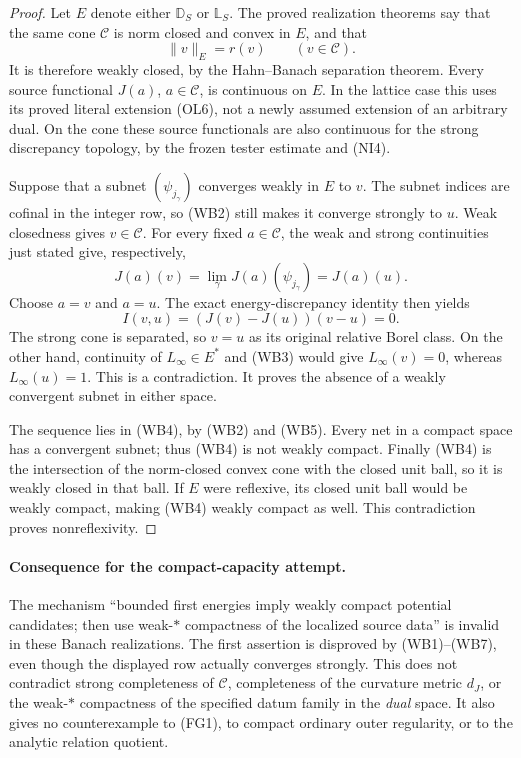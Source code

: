 \documentclass[11pt,a4paper]{article}
\numberwithin{equation}{section}
\theoremstyle{definition}
\theoremstyle{remark}
\begin{document}
\begin{proof}
Let $E$ denote either $\mathbb D_S$ or $\mathbb L_S$.
The proved realization theorems say that the same cone
$\mathscr C$ is norm closed and convex in $E$, and that
\[
                         \|v\|_E=r(v)\qquad(v\in\mathscr C).
 \tag{WB5}
\]
It is therefore weakly closed, by the Hahn--Banach
separation theorem. Every source functional $J(a)$,
$a\in\mathscr C$, is continuous on $E$. In the lattice
case this uses its proved literal extension (OL6),
not a newly assumed extension of an arbitrary dual.
On the cone these source functionals are also continuous
for the strong discrepancy topology, by the frozen
tester estimate and (NI4).

Suppose that a subnet $(\psi_{j_\gamma})$ converges
weakly in $E$ to $v$. The subnet indices are cofinal
in the integer row, so (WB2) still makes it converge
strongly to $u$. Weak closedness gives $v\in\mathscr C$.
For every fixed $a\in\mathscr C$, the weak and strong
continuities just stated give, respectively,
\[
      J(a)(v)=\lim_\gamma J(a)(\psi_{j_\gamma})=J(a)(u).
 \tag{WB6}
\]
Choose $a=v$ and $a=u$. The exact energy-discrepancy
identity then yields
\[
              I(v,u)=(J(v)-J(u))(v-u)=0.
 \tag{WB7}
\]
The strong cone is separated, so $v=u$ as its original
relative Borel class. On the other hand, continuity of
$L_\infty\in E^*$ and (WB3) would give
$L_\infty(v)=0$, whereas $L_\infty(u)=1$. This is a
contradiction. It proves the absence of a weakly
convergent subnet in either space.

The sequence lies in (WB4), by (WB2) and (WB5).
Every net in a compact space has a convergent subnet;
thus (WB4) is not weakly compact. Finally (WB4) is
the intersection of the norm-closed convex cone with
the closed unit ball, so it is weakly closed in that
ball. If $E$ were reflexive, its closed unit ball
would be weakly compact, making (WB4) weakly compact
as well. This contradiction proves nonreflexivity.
\end{proof}

\paragraph{Consequence for the compact-capacity attempt.}
The mechanism ``bounded first energies imply weakly compact
potential candidates; then use weak-$*$ compactness of the
localized source data'' is invalid in these Banach realizations.
The first assertion is disproved by (WB1)--(WB7), even though
the displayed row actually converges strongly. This does not
contradict strong completeness of $\mathscr C$, completeness
of the curvature metric $d_J$, or the weak-$*$ compactness
of the specified datum family in the \emph{dual} space.
It also gives no counterexample to (FG1), to compact ordinary
outer regularity, or to the analytic relation quotient.
\end{document}
